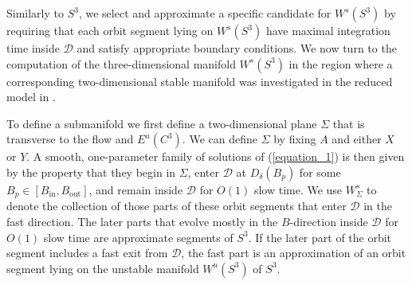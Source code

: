 \documentclass{ws-ijbc}
\begin{document}
Similarly to $S^3$, we select and approximate a specific candidate for $W^{s}(S^3)$ by requiring that each orbit segment lying on $W^{s}(S^3)$ have maximal integration time inside $\mathscr{D}$ and satisfy appropriate boundary conditions.  We now turn to the computation of the three-dimensional manifold $W^{s}(S^3)$ in the region where a corresponding two-dimensional stable manifold was investigated in the reduced model in \cite{QSSA}.

To define a submanifold we first define a two-dimensional plane $\Sigma$ that is transverse to the flow and $E^u(C^3)$.  We can define $\Sigma$ by fixing $A$ and either $X$ or $Y$.  A smooth, one-parameter family of solutions of (\ref{equation_1}) is then given by the property that they begin in $\Sigma$, enter $\mathscr{D}$ at $D_{\delta}(B_p)$ for some $B_p \in [B_{\text{in}}, B_{\text{out}}]$, and remain inside $\mathscr{D}$ for $O(1)$ slow time.  We use $W^{s}_{\Sigma}$ to denote the collection of those parts of these orbit segments that enter $\mathscr{D}$ in the fast direction.  The later parts that evolve mostly in the $B$-direction inside $\mathscr{D}$ for $O(1)$ slow time are approximate segments of $S^3$.  If the later part of the orbit segment includes a fast exit from $\mathscr{D}$, the fast part is an approximation of an orbit segment lying on the unstable manifold $W^{u}(S^3)$ of $S^3$.
\end{document}
